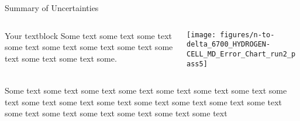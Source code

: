 \documentclass[xcolor=x11names,compress,8pt]{beamer}
\renewcommand{\(}{\begin{columns}}
\renewcommand{\)}{\end{columns}}
\newcommand{\<}[1]{\begin{column}{#1}}
\renewcommand{\>}{\end{column}}
\begin{document}
\begin{frame}{Summary of Uncertainties}


  \begin{columns}[T]
    \begin{column}{0.25\textwidth}
     \begin{block}{Your textblock}
	\pause
	Some text some text some text some text some text some text some text some text some text some text some.
    \end{block}
    \end{column}
    \begin{column}{0.8\textwidth}
    \begin{block}{}


\texttt{[image: figures/n-to-delta\_6700\_HYDROGEN-CELL\_MD\_Error\_Chart\_run2\_pass5]}\\




    \end{block}
    \end{column}


  \end{columns}



	\pause
Some text some text some text some text some text some text some text some text some text some text some text some text some text some text some text some text some text some text some text some text some text

\end{frame}
\end{document}
